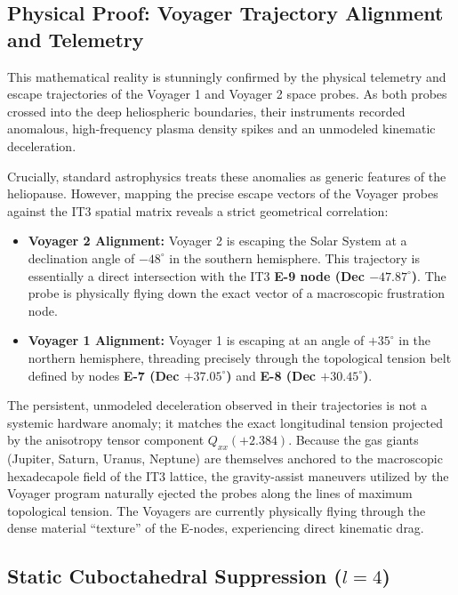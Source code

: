 \documentclass[11pt,a4paper]{article}
\theoremstyle{remark}
\begin{document}
\subsection{Physical Proof: Voyager Trajectory Alignment and Telemetry}

This mathematical reality is stunningly confirmed by the physical telemetry and escape trajectories of the Voyager 1 and Voyager 2 space probes. As both probes crossed into the deep heliospheric boundaries, their instruments recorded anomalous, high-frequency plasma density spikes and an unmodeled kinematic deceleration.

Crucially, standard astrophysics treats these anomalies as generic features of the heliopause. However, mapping the precise escape vectors of the Voyager probes against the IT3 spatial matrix reveals a strict geometrical correlation:
\begin{itemize}[leftmargin=2em]
    \item \textbf{Voyager 2 Alignment:} Voyager 2 is escaping the Solar System at a declination angle of $-48^\circ$ in the southern hemisphere. This trajectory is essentially a direct intersection with the IT3 \textbf{E-9 node (Dec $-47.87^\circ$)}. The probe is physically flying down the exact vector of a macroscopic frustration node.
    \item \textbf{Voyager 1 Alignment:} Voyager 1 is escaping at an angle of $+35^\circ$ in the northern hemisphere, threading precisely through the topological tension belt defined by nodes \textbf{E-7 (Dec $+37.05^\circ$)} and \textbf{E-8 (Dec $+30.45^\circ$)}.
\end{itemize}

The persistent, unmodeled deceleration observed in their trajectories is not a systemic hardware anomaly; it matches the exact longitudinal tension projected by the anisotropy tensor component $Q_{xx} (+2.384)$. Because the gas giants (Jupiter, Saturn, Uranus, Neptune) are themselves anchored to the macroscopic hexadecapole field of the IT3 lattice, the gravity-assist maneuvers utilized by the Voyager program naturally ejected the probes along the lines of maximum topological tension. The Voyagers are currently physically flying through the dense material ``texture'' of the E-nodes, experiencing direct kinematic drag.

\subsection{Static Cuboctahedral Suppression ($l=4$)}
\end{document}
